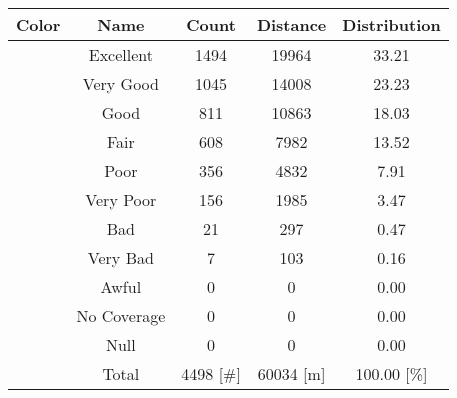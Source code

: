 \begin{tabular}{|c|c|c|c|c|}\hline
\rowcolor{Plum!20}
Color&Name&Count&Distance&Distribution\\\hline\hline
\cellcolor[HTML]{00703c} &Excellent&1494&19964&33.21\\\hline
\cellcolor[HTML]{00a032} &Very Good&1045&14008&23.23\\\hline
\cellcolor[HTML]{00d228} &Good&811&10863&18.03\\\hline
\cellcolor[HTML]{ffff00} &Fair&608&7982&13.52\\\hline
\cellcolor[HTML]{ffaa00} &Poor&356&4832&7.91\\\hline
\cellcolor[HTML]{fa6400} &Very Poor&156&1985&3.47\\\hline
\cellcolor[HTML]{ff0000} &Bad&21&297&0.47\\\hline
\cellcolor[HTML]{dc143c} &Very Bad&7&103&0.16\\\hline
\cellcolor[HTML]{820000} &Awful&0&0&0.00\\\hline
\cellcolor[HTML]{aaaaaa} &No Coverage&0&0&0.00\\\hline
\cellcolor[HTML]{000000} &Null&0&0&0.00\\\hline
\cellcolor[HTML]{ffffff} &Total&4498 [\#]&60034 [m]&100.00 [\%]\\\hline
\end{tabular}
